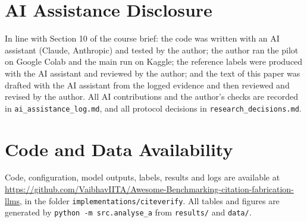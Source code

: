 \documentclass[10pt,twocolumn]{article}
\begin{document}
\section*{AI Assistance Disclosure}
In line with Section 10 of the course brief: the code was written with an AI assistant (Claude, Anthropic) and tested by the author; the author ran the pilot on Google Colab and the main run on Kaggle; the reference labels were produced with the AI assistant and reviewed by the author; and the text of this paper was drafted with the AI assistant from the logged evidence and then reviewed and revised by the author. All AI contributions and the author's checks are recorded in \texttt{ai\_assistance\_log.md}, and all protocol decisions in \texttt{research\_decisions.md}.

\section*{Code and Data Availability}
Code, configuration, model outputs, labels, results and logs are available at \url{https://github.com/VaibhavIITA/Awesome-Benchmarking-citation-fabrication-llms}, in the folder \texttt{implementations/citeverify}. All tables and figures are generated by \texttt{python -m src.analyse\_a} from \texttt{results/} and \texttt{data/}.



\end{document}
